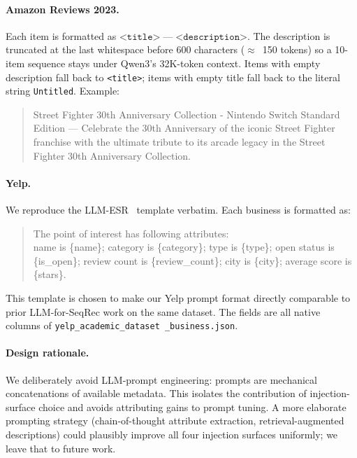 \documentclass{article}
\begin{document}
\paragraph{Amazon Reviews 2023.} Each item is formatted as
$\texttt{<title>}\;\text{---}\;\texttt{<description>}$. The
description is truncated at the last whitespace before 600
characters ($\approx$~150 tokens) so a 10-item sequence stays
under Qwen3's 32K-token context. Items with empty
description fall back to \texttt{<title>}; items with empty title
fall back to the literal string \texttt{Untitled}. Example:

\begin{quote}\small\ttfamily
Street Fighter 30th Anniversary Collection - Nintendo Switch
Standard Edition --- Celebrate the 30th Anniversary of the iconic
Street Fighter franchise with the ultimate tribute to its arcade
legacy in the Street Fighter 30th Anniversary Collection.
\end{quote}

\paragraph{Yelp.} We reproduce the LLM-ESR~\citep{llmesr} template
verbatim. Each business is formatted as:

\begin{quote}\small\ttfamily
The point of interest has following attributes:\\
\hspace*{1ex}name is \{name\}; category is \{category\}; type is
\{type\}; open status is \{is\_open\}; review count is
\{review\_count\}; city is \{city\}; average score is \{stars\}.
\end{quote}

This template is chosen to make our Yelp prompt format directly
comparable to prior LLM-for-SeqRec work on the same dataset. The
fields are all native columns of \texttt{yelp\_academic\_dataset
\_business.json}.

\paragraph{Design rationale.} We deliberately avoid LLM-prompt
engineering: prompts are mechanical concatenations of available
metadata. This isolates the contribution of injection-surface
choice and avoids attributing gains to prompt tuning. A more
elaborate prompting strategy (chain-of-thought attribute
extraction, retrieval-augmented descriptions) could plausibly
improve all four injection surfaces uniformly; we leave that to
future work.
\end{document}
